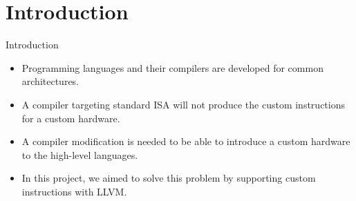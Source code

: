 \section{Introduction}
\begin{frame}{Introduction}
\begin{itemize}
        \item Programming languages and their compilers are developed for common architectures.
        \item A compiler targeting standard ISA will not produce the custom instructions for a custom hardware.
	\item A compiler modification is needed to be able to introduce a custom hardware
to the high-level languages.
	\item In this project, we aimed to solve this problem by supporting custom instructions with LLVM.
    \end{itemize}

\end{frame}
